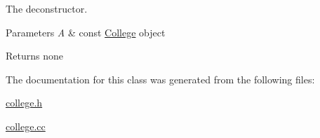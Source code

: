 The deconstructor. 


\begin{DoxyParams}{Parameters}
{\em A} & const \hyperlink{classCollege}{College} object \\
\hline
\end{DoxyParams}
\begin{DoxyReturn}{Returns}
none 
\end{DoxyReturn}


The documentation for this class was generated from the following files\+:\begin{DoxyCompactItemize}
\item 
\hyperlink{college_8h}{college.\+h}\item 
\hyperlink{college_8cc}{college.\+cc}\end{DoxyCompactItemize}
